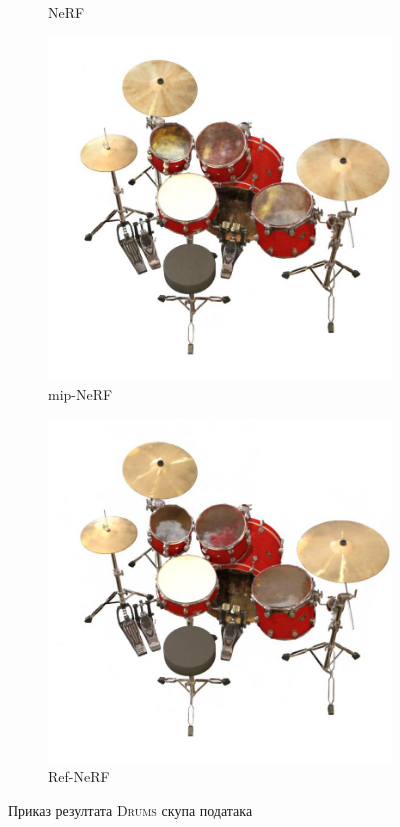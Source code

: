\documentclass[12pt, a4paper, twoside]{book}
\numberwithin{equation}{chapter}
\numberwithin{theorem}{section}
\numberwithin{definition}{section}
\numberwithin{definitionChapter}{chapter}
\begin{document}
\begin{figure}[H]
\begin{subfigure}{0.475\textwidth}
			\caption{NeRF}
		\end{subfigure}
		\begin{subfigure}{0.475\textwidth}
			\centering
			\includegraphics[scale=0.25]{img/mipnerf/mipnerf_drums_3.jpg}
			\caption{mip-NeRF}
		\end{subfigure}
		\begin{subfigure}{0.475\textwidth}
			\centering
			\includegraphics[scale=0.25]{img/refnerf/refnerf_drums_3.jpg}
			\caption{Ref-NeRF}
		\end{subfigure}
		\caption{Приказ резултата \textsc{Drums} скупа података}
		\label{fig-drums-results}
	\end{figure}
\end{document}
